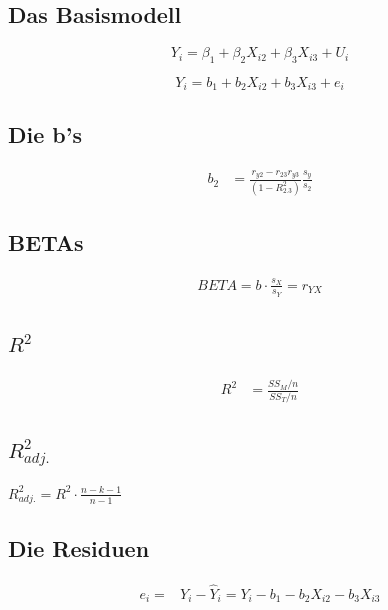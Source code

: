 \documentclass[
  10pt,
  letterpaper,
  a4paper, twoside]{scrreprt}
\begin{document}

\subsection*{Das Basismodell}\label{das-basismodell}

\[
   Y_i = \beta_1 + \beta_2X_{i2} + \beta_3X_{i3} + U_i
\]

\[
 Y_i  = b_1 + b_2X_{i2} + b_3X_{i3}+e_i
\]

\subsection*{Die b's}\label{die-bs}

\begin{align}
 b_2 & = \frac{r_{y2}-r_{23}r_{y3}}{(1-R_{2.3}^2)}\frac{s_y}{s_2}
\end{align}

\subsection*{BETAs}\label{betas}

\begin{align}
  BETA = b\cdot\frac{s_X}{s_Y} = r_{YX}
\end{align}

\subsection*{\texorpdfstring{\(R^2\)}{R\^{}2}}\label{r2}

\begin{align}
 R^2 & = \frac{SS_M/n}{SS_T/n}
\end{align}

\subsection*{\texorpdfstring{\(R^2_{adj.}\)}{R\^{}2\_\{adj.\}}}\label{r2_adj.}

\(R^2_{adj.} = R^2\cdot\frac{n-k-1}{n-1}\)

\subsection*{Die Residuen}\label{die-residuen}

\begin{align}
e_i= & Y_i-\hat{Y}_i=Y_i-b_1-b_2 X_{i 2}-b_3 X_{i 3}
\end{align}
\end{document}
